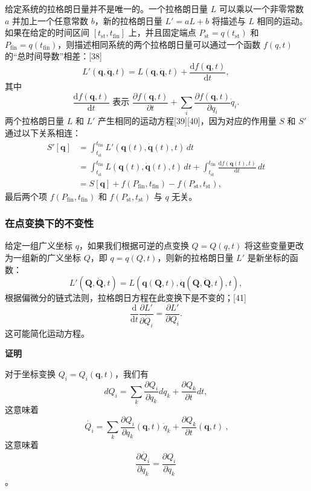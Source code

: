 给定系统的拉格朗日量并不是唯一的。一个拉格朗日量 \( L \) 可以乘以一个非零常数 \( a \) 并加上一个任意常数 \( b \)，新的拉格朗日量 \( L' = aL + b \) 将描述与 \( L \) 相同的运动。如果在给定的时间区间 \([t_{\text{st}}, t_{\text{fin}}]\) 上，并且固定端点 \( P_{\text{st}} = q(t_{\text{st}}) \) 和 \( P_{\text{fin}} = q(t_{\text{fin}}) \)，则描述相同系统的两个拉格朗日量可以通过一个函数 \( f(q, t) \) 的“总时间导数”相差：[38]
\[
L'(\mathbf{q}, \dot{\mathbf{q}}, t) = L(\mathbf{q}, \dot{\mathbf{q}}, t) + \frac{\mathrm{d} f(\mathbf{q}, t)}{\mathrm{d} t},~
\]
其中 
\[
\frac{\mathrm{d} f(\mathbf{q}, t)}{\mathrm{d} t} \text{ 表示 } \frac{\partial f(\mathbf{q}, t)}{\partial t} + \sum_{i} \frac{\partial f(\mathbf{q}, t)}{\partial q_{i}} \dot{q}_{i}.~
\]
两个拉格朗日量 \( L \) 和 \( L' \) 产生相同的运动方程[39][40]，因为对应的作用量 \( S \) 和 \( S' \) 通过以下关系相连：
\[
\begin{aligned}
S'[\mathbf{q}] &= \int_{t_{\text{st}}}^{t_{\text{fin}}} L'(\mathbf{q}(t), \dot{\mathbf{q}}(t), t) \, dt \\
&= \int_{t_{\text{st}}}^{t_{\text{fin}}} L(\mathbf{q}(t), \dot{\mathbf{q}}(t), t) \, dt + \int_{t_{\text{st}}}^{t_{\text{fin}}} \frac{\mathrm{d} f(\mathbf{q}(t), t)}{\mathrm{d} t} \, dt \\
&= S[\mathbf{q}] + f(P_{\text{fin}}, t_{\text{fin}}) - f(P_{\text{st}}, t_{\text{st}}),
\end{aligned}~
\]
最后两个项 \( f(P_{\text{fin}}, t_{\text{fin}}) \) 和 \( f(P_{\text{st}}, t_{\text{st}}) \) 与 \( q \) 无关。
\subsubsection{在点变换下的不变性}
给定一组广义坐标 \( q \)，如果我们根据可逆的点变换 \( Q = Q(q, t) \) 将这些变量更改为一组新的广义坐标 \( Q \)，即 \( q = q(Q, t) \)，则新的拉格朗日量 \( L' \) 是新坐标的函数：
\[
L'(\mathbf{Q}, \dot{\mathbf{Q}}, t) = L(\mathbf{q}(\mathbf{Q}, t), \dot{\mathbf{q}}(\mathbf{Q}, \dot{\mathbf{Q}}, t), t),~
\]
根据偏微分的链式法则，拉格朗日方程在此变换下是不变的；[41]
\[
\frac{\mathrm{d}}{\mathrm{d} t} \frac{\partial L'}{\partial \dot{Q}_{i}} = \frac{\partial L'}{\partial Q_{i}}.~
\]
这可能简化运动方程。

\textbf{证明}

对于坐标变换 
\({\displaystyle Q_{i}=Q_{i}(\mathbf {q} ,t)}\)，我们有
\[{\displaystyle d{Q_{i}}=\sum _{k}{\frac {\partial Q_{i}}{\partial q_{k}}}d{q_{k}}+{\frac {\partial Q_{k}}{\partial t}}dt,}~\]
这意味着 
\[{\displaystyle {\dot {Q_{i}}}=\sum _{k}{\frac {\partial Q_{i}}{\partial q_{k}}}(\mathbf {q} ,t)\,{\dot {q}}_{k}+{\frac {\partial Q_{k}}{\partial t}}(\mathbf {q} ,t)}~,\]
这意味着
\[{\displaystyle {\frac {\partial {\dot {Q_{i}}}}{\partial {\dot {q}}_{k}}}={\frac {\partial Q_{i}}{\partial q_{k}}}}~\]。


